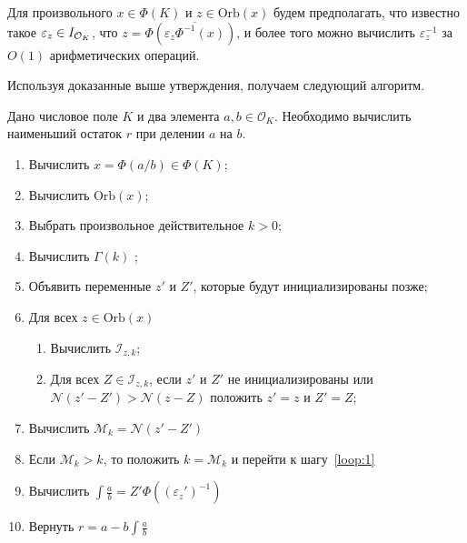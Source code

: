 \documentclass[_00_dissertation.tex]{subfiles}
\begin{document}
\begin{remark}
    Для произвольного $x \in \Phi(K)$ и $z \in \textrm{Orb}(x)$ будем предполагать, что известно такое $\varepsilon_z \in I_{\mathcal{O}_K}$, что $z = \Phi(\overline{\varepsilon_z \Phi^{-1}(x)})$, и более того можно вычислить $\varepsilon_z^{-1}$ за $O(1)$ арифметических операций.
\end{remark}

Используя доказанные выше утверждения, получаем следующий алгоритм.

\begin{algorithm}\label{algorithm:least_norm_remainder}
    Дано числовое поле $K$ и два элемента $a, b \in \mathcal{O}_K$.
    Необходимо вычислить наименьший остаток $r$ при делении $a$ на $b$.

    \begin{enumerate}
        \item Вычислить $x = \Phi(a/b) \in \Phi(K)$;
        
        \item Вычислить $\textrm{Orb}(x)$;

        \item Выбрать произвольное действительное $k > 0$;

        \item Вычислить $\Gamma(k)$ \label{loop:1};

        \item Объявить переменные $z'$ и $Z'$, которые будут инициализированы позже;

        \item Для всех $z \in \textrm{Orb}(x)$
        \begin{enumerate}
            \item Вычислить $\mathcal{I}_{z, k}$;

            \item Для всех $Z \in \mathcal{I}_{z, k}$, если $z'$ и $Z'$ не инициализированы или $\mathcal{N}(z' - Z') > \mathcal{N}(z - Z)$ положить $z' = z$ и $Z' = Z$;
        \end{enumerate}

        \item Вычислить $\mathcal{M}_k = \mathcal{N}(z' - Z')$
        
        \item Если $\mathcal{M}_k > k$, то положить $k = \mathcal{M}_k$ и перейти к шагу~\ref{loop:1}

        \item Вычислить $\int{\frac{a}{b}} = Z'\Phi((\varepsilon_z')^{-1})$

        \item Вернуть $r = a - b \int{\frac{a}{b}}$
    \end{enumerate}
\end{algorithm}
\end{document}
